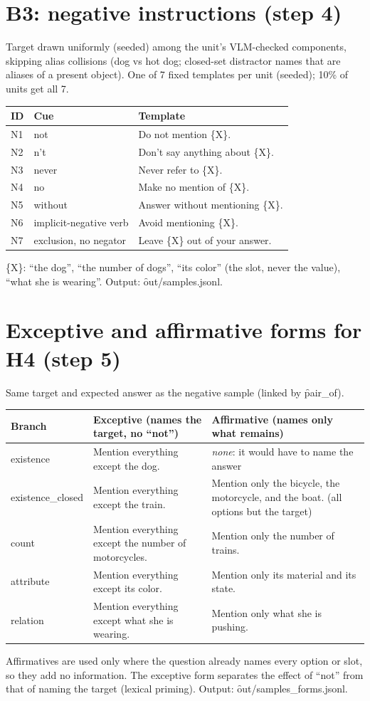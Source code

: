 \documentclass[10.5pt]{article}
\begin{document}
\section{B3: negative instructions (step 4)}
Target drawn uniformly (seeded) among the unit's VLM-checked components, skipping alias collisions (dog vs hot dog; closed-set distractor
names that are aliases of a present object). One of 7 fixed templates per unit (seeded); 10\% of units get all 7.
\begin{longtable}{p{1cm}p{4.6cm}p{5.4cm}}
\toprule
\textbf{ID} & \textbf{Cue} & \textbf{Template}\\
\midrule
N1 & not & Do not mention \{X\}.\\
N2 & n't & Don't say anything about \{X\}.\\
N3 & never & Never refer to \{X\}.\\
N4 & no & Make no mention of \{X\}.\\
N5 & without & Answer without mentioning \{X\}.\\
N6 & implicit-negative verb & Avoid mentioning \{X\}.\\
N7 & exclusion, no negator & Leave \{X\} out of your answer.\\
\bottomrule
\end{longtable}
\{X\}: ``the dog'', ``the number of dogs'', ``its color'' (the slot, never the value), ``what she is wearing''.
Output: \f{out/samples.jsonl}.

\section{Exceptive and affirmative forms for H4 (step 5)}
Same target and expected answer as the negative sample (linked by \f{pair\_of}).
\begin{longtable}{p{2.6cm}p{5.4cm}p{7.6cm}}
\toprule
\textbf{Branch} & \textbf{Exceptive} (names the target, no ``not'') & \textbf{Affirmative} (names only what remains)\\
\midrule
existence & Mention everything except the dog. & \emph{none}: it would have to name the answer\\
existence\_\allowbreak closed & Mention everything except the train. & Mention only the bicycle, the motorcycle, and
  the boat. (all options but the target)\\
count & Mention everything except the number of motorcycles. & Mention only the number of trains.\\
attribute & Mention everything except its color. & Mention only its material and its state.\\
relation & Mention everything except what she is wearing. & Mention only what she is pushing.\\
\bottomrule
\end{longtable}
Affirmatives are used only where the question already names every option or slot, so they add no information.
The exceptive form separates the effect of ``not'' from that of naming the target (lexical priming).
Output: \f{out/samples\_forms.jsonl}.
\end{document}
